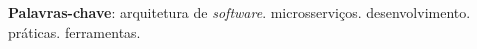 \begin{resumo}


 \textbf{Palavras-chave}: arquitetura de \emph{software}. microsserviços. desenvolvimento. práticas. ferramentas.
\end{resumo}